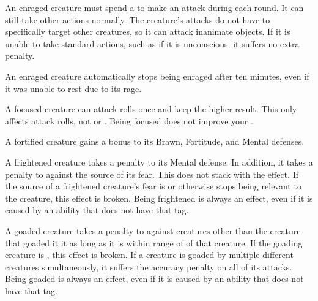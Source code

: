    An enraged creature must spend a  to make an attack during each round.
  It can still take other actions normally.
  The creature's attacks do not have to specifically target other creatures, so it can attack inanimate objects.
  If it is unable to take standard actions, such as if it is unconscious, it suffers no extra penalty.

  An enraged creature automatically stops being enraged after ten minutes, even if it was unable to rest due to its rage.

   A focused creature can  attack rolls once and keep the higher result.
  This only affects attack rolls, not  or .
  Being focused does not improve your .

   A fortified creature gains a  bonus to its Brawn, Fortitude, and Mental defenses.

   A frightened creature takes a  penalty to its Mental defense.
  In addition, it takes a  penalty to  against the source of its fear.
  This does not stack with the \panicked effect.
  If the source of a frightened creature's fear is  or otherwise stops being relevant to the creature, this effect is broken.
  Being frightened is always an  effect, even if it is caused by an ability that does not have that tag.

   A goaded creature takes a  penalty to  against creatures other than the creature that goaded it it as long as it is within \rngmed range of of that creature.
  If the goading creature is , this effect is broken.
  If a creature is goaded by multiple different creatures simultaneously, it suffers the accuracy penalty on all of its attacks.
  Being goaded is always an  effect, even if it is caused by an ability that does not have that tag.

